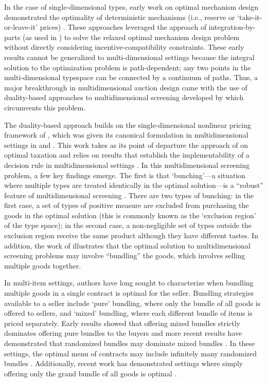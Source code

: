 In the case of single-dimensional types, early work on optimal mechanism design demonstrated the optimality of deterministic mechanisms (i.e., reserve or `take-it-or-leave-it' prices) \autocite{myerson1981optimal,riley1983}. These approaches leveraged the approach of integration-by-parts (as used in \cite{mussa1978}) to solve the relaxed optimal mechanism design problem without directly considering incentive-compatibility constraints. These early results cannot be generalized to multi-dimensional settings because the integral solution to the optimization problem is path-dependent; any two points in the multi-dimensional typespace can be connected by a continuum of paths. Thus, a major breakthrough in multidimensional auction design came with the use of duality-based approaches to multidimensional screening developed by \autocite{rochet1998ironing} which circumvents this problem.

The duality-based approach \autocite{rochet1998ironing} builds on the single-dimensional nonlinear pricing framework of \autocite{mussa1978}, which was given its canonical formulation in multidimensional settings in \autocite{wilson1993nonlinear} and \autocite{armstrong1996multiproduct}. This work takes as its point of departure the approach of \autocite{mirrlees1971} on optimal taxation and relies on results that establish the implementability of a decision rule in multidimensional settings \autocite{rochet1987}. In this multidimensional screening problem, a few key findings emerge. The first is that `bunching'---a situation where multiple types are treated identically in the optimal solution---is a ``robust'' feature of multidimensional screening \autocite{rochetstole2003,rochet1998ironing}. There are two types of bunching: in the first case, a set of types of positive measure are excluded from purchasing the goods in the optimal solution (this is commonly known as the `exclusion region' of the type space); in the second case, a non-negligible set of types outside the exclusion region receive the same product although they have different tastes. In addition, the work of \autocite{rochet1998ironing} illustrates that the optimal solution to multidimensional screening problems may involve ``bundling'' the goods, which involves selling multiple goods together.

In multi-item settings, authors have long sought to characterize when bundling multiple goods in a single contract is optimal for the seller. Bundling strategies available to a seller include `pure' bundling, where only the bundle of all goods is offered to sellers, and `mixed' bundling, where each different bundle of items is priced separately. Early results showed that offering mixed bundles strictly dominates offering pure bundles to the buyers \autocite{adams1976,mcafee1989} and more recent results have demonstrated that randomized bundles may dominate mixed bundles \autocite{thanassoulis2004,daskalakis2017strong}. In these settings, the optimal menu of contracts may include infinitely many randomized bundles \autocite{manelli2007multidimensional,hart2019}. Additionally, recent work has demonstrated settings where simply offering only the grand bundle of all goods is optimal \autocite{haghpanah2021}.

